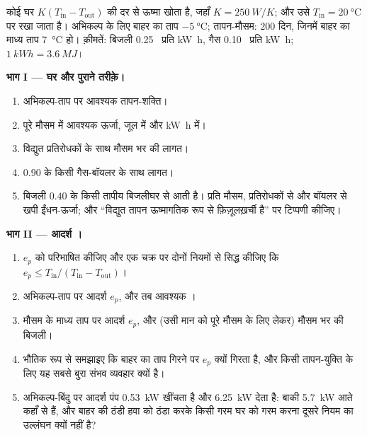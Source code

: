 \begin{problem}
\label{pb:b1:heat-engines:1}
कोई घर $K(T_{\mathrm{in}} - T_{\mathrm{out}})$ की दर से ऊष्मा खोता है, जहाँ
$K = \qty{250}{W/K}$; और उसे $T_{\mathrm{in}} = \qty{20}{\degreeCelsius}$ पर
रखा जाता है। अभिकल्प के लिए बाहर का ताप $\qty{-5}{\degreeCelsius}$;
तापन-मौसम: $200$ दिन, जिनमें बाहर का माध्य ताप \qty{7}{\degreeCelsius} हो।
क़ीमतें: बिजली 0.25~\texteuro{} प्रति \unit{kW h}, गैस 0.10~\texteuro{} प्रति
\unit{kW h}; $\qty{1}{kW h} = \qty{3.6}{MJ}$।

\medskip
\noindent\textbf{भाग I --- घर और पुराने तरीक़े।}
\begin{enumerate}
  \item अभिकल्प-ताप पर आवश्यक तापन-शक्ति।
  \item पूरे मौसम में आवश्यक ऊर्जा, जूल में और \unit{kW h} में।
  \item विद्युत प्रतिरोधकों के साथ मौसम भर की लागत।
  \item $0.90$  के किसी गैस-बॉयलर के साथ लागत।
  \item बिजली $0.40$  के किसी तापीय बिजलीघर से आती है। प्रति मौसम,
        प्रतिरोधकों से और बॉयलर से खपी ईंधन-ऊर्जा; और ``विद्युत तापन
        ऊष्मागतिक रूप से फ़िज़ूलख़र्ची है'' पर टिप्पणी कीजिए।
\end{enumerate}

\medskip
\noindent\textbf{भाग II --- आदर्श ।}
\begin{enumerate}[resume]
  \item $e_p$ को परिभाषित कीजिए और एक चक्र पर दोनों नियमों से सिद्ध कीजिए
        कि $e_p \leq T_{\mathrm{in}}/(T_{\mathrm{in}} - T_{\mathrm{out}})$।
  \item अभिकल्प-ताप पर आदर्श $e_p$, और तब आवश्यक ।
  \item मौसम के माध्य ताप पर आदर्श $e_p$, और (उसी मान को पूरे मौसम के लिए
        लेकर) मौसम भर की बिजली।
  \item भौतिक रूप से समझाइए कि बाहर का ताप गिरने पर $e_p$ क्यों गिरता है,
        और किसी तापन-युक्ति के लिए यह सबसे बुरा संभव व्यवहार क्यों है।
  \item अभिकल्प-बिंदु पर आदर्श पंप \qty{0.53}{kW} खींचता है और
        \qty{6.25}{kW} देता है: बाकी \qty{5.7}{kW} आते कहाँ से हैं, और
        बाहर की ठंडी हवा को ठंडा करके किसी गरम घर को गरम करना दूसरे नियम
        का उल्लंघन क्यों नहीं है?
\end{enumerate}


\end{problem}
